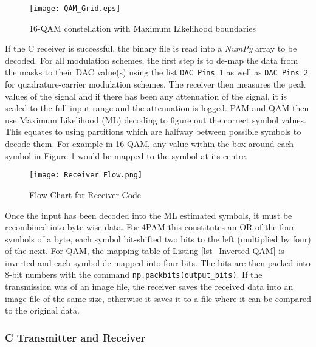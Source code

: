 \documentclass[../main.tex]{subfiles}
\begin{document}
\begin{figure}[ht]
	\centering
	\texttt{[image: QAM\_Grid.eps]}
	\caption{16-QAM constellation with Maximum Likelihood boundaries}
	\label{fig_QAM ML Decoding}
\end{figure}

If the C receiver is successful, the binary file is read into a \textit{NumPy} array to be decoded.
For all modulation schemes, the first step is to de-map the data from the masks to their DAC value(s) using the list \colorbox{backcolour}{\lstinline{DAC_Pins_1}} as well as \colorbox{backcolour}{\lstinline{DAC_Pins_2}} for quadrature-carrier modulation schemes.
The receiver then measures the peak values of the signal and if there has been any attenuation of the signal, it is scaled to the full input range and the attenuation is logged.
PAM and QAM then use Maximum Likelihood (ML) decoding to figure out the correct symbol values.
This equates to using partitions which are halfway between possible symbols to decode them.
For example in 16-QAM, any value within the box around each symbol in Figure \ref{fig_QAM ML Decoding} would be mapped to the symbol at its centre.

\begin{figure}[!h]
 	\centering
 	\texttt{[image: Receiver\_Flow.png]}
 	\caption{Flow Chart for Receiver Code}
 	\label{fig_Receiver_Flow}
\end{figure}

Once the input has been decoded into the ML estimated symbols, it must be recombined into byte-wise data.
For 4PAM this constitutes an OR of the four symbols of a byte, each symbol bit-shifted two bits to the left (multiplied by four) of the next.
For QAM, the mapping table of Listing \ref{lst_Inverted QAM} is inverted and each symbol de-mapped into four bits.
The bits are then packed into 8-bit numbers with the command \colorbox{backcolour}{\lstinline{np.packbits(output_bits)}}.
If the transmission was of an image file, the receiver saves the received data into an image file of the same size, otherwise it saves it to a file where it can be compared to the original data.

\subsubsection{C Transmitter and Receiver} \label{sec_C Transmitter and Receiver}
\end{document}
